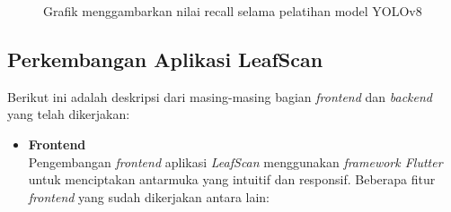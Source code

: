 \documentclass[journal,article,submit,pdftex,moreauthors]{Definitions/mdpi}
\begin{document}
\begin{itemize}
\begin{figure}[H]
        \caption{\centering Grafik menggambarkan nilai recall selama pelatihan model YOLOv8}
        \label{fig:activity-view-history}
    \end{figure}
\end{itemize}

\subsection{Perkembangan Aplikasi LeafScan}
Berikut ini adalah deskripsi dari masing-masing bagian \textit{frontend} dan \textit{backend} yang telah dikerjakan:

\begin{itemize}
    \item \textbf{Frontend} \\
    Pengembangan \textit{frontend} aplikasi \textit{LeafScan} menggunakan \textit{framework Flutter} untuk menciptakan antarmuka yang intuitif dan responsif. Beberapa fitur \textit{frontend} yang sudah dikerjakan antara lain:


\end{itemize}
\end{document}
